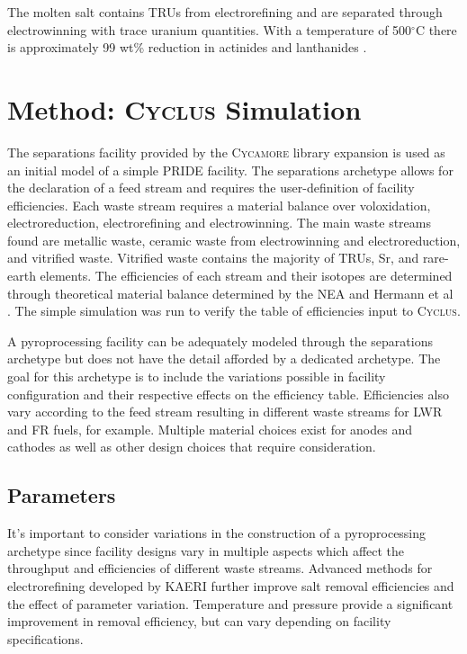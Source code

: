 \documentclass{anstrans}
\newcommand{\Cyclus}{\textsc{Cyclus}\xspace}%
\newcommand{\Cycamore}{\textsc{Cycamore}\xspace}%
\begin{document}
The molten salt contains TRUs from electrorefining and are separated through electrowinning with trace uranium quantities. 
With a temperature of 500$^{\circ}$C there is approximately 99 wt\% reduction in actinides and lanthanides \cite{flowsheet_1998}. 
\section{Method: \Cyclus Simulation}
The separations facility provided by the \Cycamore library expansion is used as an initial model of a simple PRIDE facility. 
The separations archetype allows for the declaration of a feed stream and requires the user-definition of facility efficiencies. 
Each waste stream requires a material balance over voloxidation, electroreduction, electrorefining and electrowinning. The main 
waste streams found are metallic waste, ceramic waste from electrowinning and electroreduction, and vitrified waste. Vitrified 
waste contains the majority of TRUs, Sr, and rare-earth elements. The efficiencies of each stream and their isotopes are 
determined through theoretical material balance determined by the NEA and Hermann et al \cite{flowsheet_1998,herrmann_separation_2010}. 
The simple simulation was run to verify the table of efficiencies input to \Cyclus.

A pyroprocessing facility can be adequately modeled through the separations archetype but does not have the detail afforded 
by a dedicated archetype. The goal for this archetype is to include the variations possible in facility configuration and 
their respective effects on the efficiency table. Efficiencies also vary according to the feed stream resulting in different 
waste streams for LWR and FR fuels, for example. Multiple material choices exist for anodes and cathodes as well as other 
design choices that require consideration. 

\subsection{Parameters}
It's important to consider variations in the construction of a pyroprocessing archetype since facility designs vary in 
multiple aspects which affect the throughput and efficiencies of different waste streams. Advanced methods for electrorefining 
developed by KAERI \cite{lee_advanced_nodate} further improve salt removal efficiencies and the effect of parameter variation. 
Temperature and pressure provide a significant improvement in removal efficiency, but can vary depending on facility specifications. 
\end{document}
